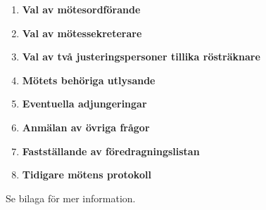 \documentclass{protokoll}
\begin{document}
\begin{motesfakta} %
  \narvarande
\end{motesfakta}






  \begin{enumerate}
    \item\textbf{Val av mötesordförande}
    \item\textbf{Val av mötessekreterare}
    \item\textbf{Val av två justeringspersoner tillika rösträknare}
    \item\textbf{Mötets behöriga utlysande}
    \item\textbf{Eventuella adjungeringar}
    \item\textbf{Anmälan av övriga frågor}
    \item\textbf{Fastställande av föredragningslistan}
    \item\textbf{Tidigare mötens protokoll}
  \end{enumerate}



Se bilaga för mer information.
\end{document}

